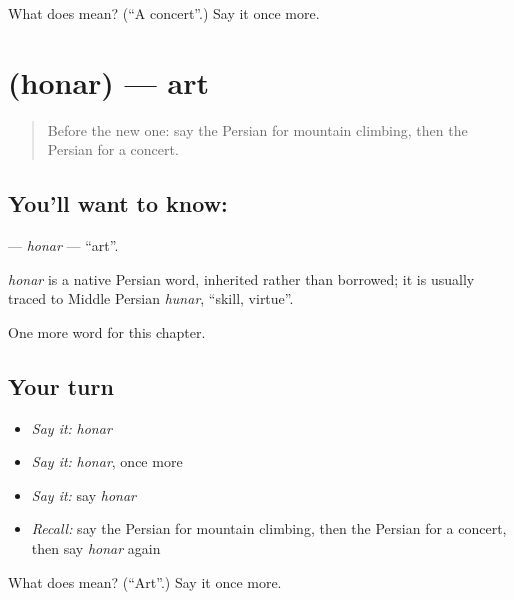 \begin{tcolorbox}[breakable,colback=teal!4,colframe=teal!35!black,title={Before you move on}]
What does  mean? (\textquotedblleft{}A concert\textquotedblright{}.) Say it once more.
\end{tcolorbox}
\section[\texorpdfstring{\fa{هنر} (honar)}{هنر (honar)}]{ (honar) — art}

\label{lesson:FA-C280-honar}



\begin{quote}
Before the new one: say the Persian for mountain climbing, then the Persian for a concert.
\end{quote}

\subsection*{You'll want to know: }
\textbf{} — \emph{honar} — \textquotedblleft{}art\textquotedblright{}.

\begin{cousinweb}
\emph{honar} is a native Persian word, inherited rather than borrowed; it is usually traced to Middle Persian \emph{hunar}, \textquotedblleft{}skill, virtue\textquotedblright{}.
\end{cousinweb}

\begin{grammarlens}[title={What you've built}]
One more word for this chapter.
\end{grammarlens}

\subsection*{Your turn}
\begin{itemize}
\raggedright
  \item \emph{Say it:} \emph{honar}
  \item \emph{Say it:} \emph{honar}, once more
  \item \emph{Say it:} say \emph{honar}
  \item \emph{Recall:} say the Persian for mountain climbing, then the Persian for a concert, then say \emph{honar} again
\end{itemize}

\begin{tcolorbox}[breakable,colback=teal!4,colframe=teal!35!black,title={Before you move on}]
What does  mean? (\textquotedblleft{}Art\textquotedblright{}.) Say it once more.
\end{tcolorbox}
